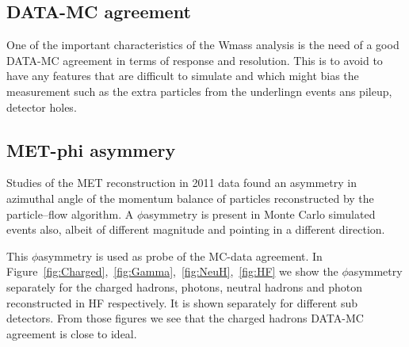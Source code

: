 \subsection{DATA-MC agreement}

One of the important characteristics of the Wmass analysis is the need of a good DATA-MC agreement in terms of response and resolution.
This is to avoid to have any features that are difficult to simulate and which might bias the measurement such as the extra particles from the underlingn events ans pileup, detector holes.


\subsection{MET-phi asymmery}
Studies of the MET reconstruction in 2011 data found an asymmetry in azimuthal angle of the
 momentum balance of particles reconstructed by the particle–flow algorithm.
A $\phi$\–asymmetry is present in Monte Carlo simulated events also,
albeit of different magnitude and pointing in a different direction.

This $\phi$\–asymmetry is used as probe of the MC-data agreement.
In Figure~\ref{fig:Charged},~\ref{fig:Gamma},~\ref{fig:NeuH},~\ref{fig:HF} we show the $\phi$\–asymmetry separately for the
charged hadrons, photons, neutral hadrons and photon reconstructed in HF respectively.
It is shown separately for different sub detectors.
From those figures we see that the charged hadrons DATA-MC agreement is close to ideal.

